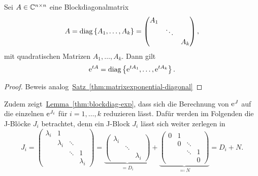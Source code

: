 \begin{lemma}\label{thm:blockdiag-exp}
    Sei $A \in \mathbb{C}^{n \times n}$ eine Blockdiagonalmatrix
    \begin{equation*}
        A = \operatorname{diag}\left\{A_1,\dots,A_k\right\}
        = \begin{pmatrix}
                A_1 &        & \\
                    & \ddots & \\
                    &        & A_k
        \end{pmatrix},
    \end{equation*}
    mit quadratischen Matrizen $A_1, \dots, A_k$.
    Dann gilt
    \begin{equation*}
        \mathrm{e}^{t A} = \operatorname{diag}\left\{ \mathrm{e}^{t A_1}, \dots,\mathrm{e}^{t A_k} \right\}.
    \end{equation*}
\end{lemma}

\begin{proof}
    Beweis analog~\hyperref[thm:matrixexponential-diagonal]{Satz~\ref*{thm:matrixexponential-diagonal}}
\end{proof}

Zudem zeigt~\hyperref[thm:blockdiag-exp]{Lemma~\ref*{thm:blockdiag-exp}},
dass sich die Berechnung von $\mathrm{e}^J$ auf die einzelnen $\mathrm{e}^{J_i}$ für $i = 1,\dots,k$ reduzieren lässt.
Dafür werden im Folgenden die J-Blöcke $J_i$ betrachtet,
denn ein J-Block $J_i$ lässt sich weiter zerlegen in
\begin{equation*}
    J_i = \begin{pmatrix}
              \lambda_i & 1         &        & \\
                        & \lambda_i & \ddots & \\
                        &           & \ddots & 1 \\
                        &           &        & \lambda_i
    \end{pmatrix}
    = \underbrace{\begin{pmatrix}
        \lambda_i &        & \\
                  & \ddots & \\
                  &        & \lambda_i
    \end{pmatrix}}_{= D_i}
    + \underbrace{\begin{pmatrix}
          0 & 1 &        & \\
            & 0 & \ddots & \\
            &   & \ddots & 1 \\
            &   &        & 0
    \end{pmatrix}}_{\eqqcolon N}
    = D_i + N.
\end{equation*}

